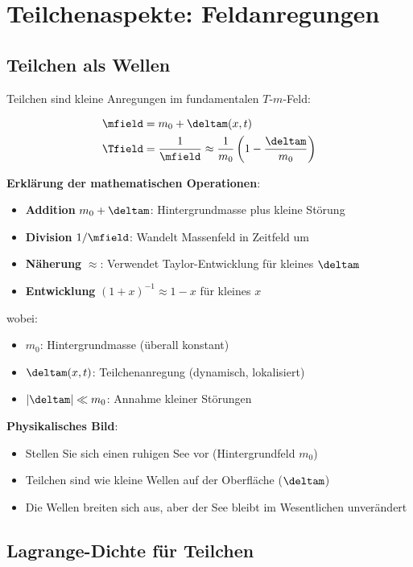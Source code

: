 	\section{Teilchenaspekte: Feldanregungen}
	
	\subsection{Teilchen als Wellen}
	
	Teilchen sind kleine Anregungen im fundamentalen $T$-$m$-Feld:
	
	\begin{align}
		\mfield &= m_0 + \deltam(x,t) \\
		\Tfield &= \frac{1}{\mfield} \approx \frac{1}{m_0}\left(1 - \frac{\deltam}{m_0}\right)
	\end{align}
	
	\textbf{Erklärung der mathematischen Operationen}:
	\begin{itemize}
		\item \textbf{Addition} $m_0 + \deltam$: Hintergrundmasse plus kleine Störung
		\item \textbf{Division} $1/\mfield$: Wandelt Massenfeld in Zeitfeld um
		\item \textbf{Näherung} $\approx$: Verwendet Taylor-Entwicklung für kleines $\deltam$
		\item \textbf{Entwicklung} $(1 + x)^{-1} \approx 1 - x$ für kleines $x$
	\end{itemize}
	
	wobei:
	\begin{itemize}
		\item $m_0$: Hintergrundmasse (überall konstant)
		\item $\deltam(x,t)$: Teilchenanregung (dynamisch, lokalisiert)
		\item $|\deltam| \ll m_0$: Annahme kleiner Störungen
	\end{itemize}
	
	\textbf{Physikalisches Bild}: 
	\begin{itemize}
		\item Stellen Sie sich einen ruhigen See vor (Hintergrundfeld $m_0$)
		\item Teilchen sind wie kleine Wellen auf der Oberfläche ($\deltam$)
		\item Die Wellen breiten sich aus, aber der See bleibt im Wesentlichen unverändert
	\end{itemize}
	
	\subsection{Lagrange-Dichte für Teilchen}
	
